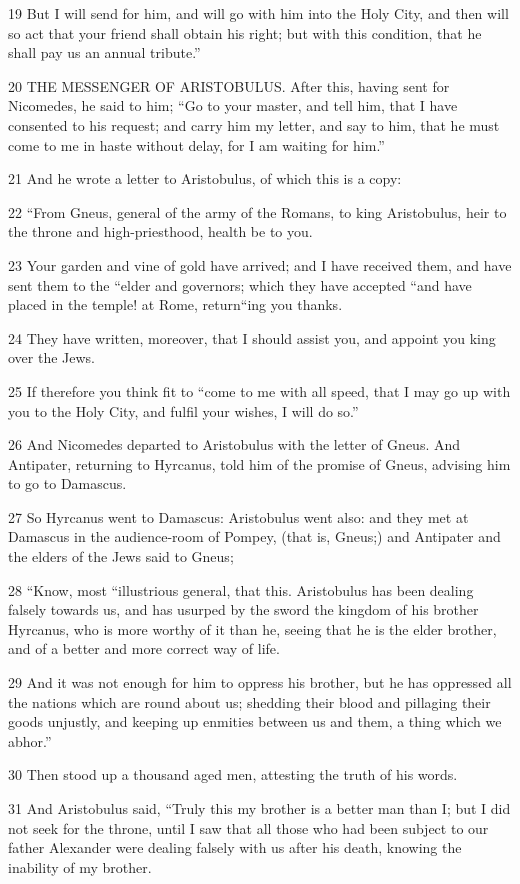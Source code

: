 19 But I will send for him, and will go with him into the Holy City, and then will so act that your friend shall obtain his right; but with this condition, that he shall pay us an annual tribute.” 

20 THE MESSENGER OF ARISTOBULUS. After this, having sent for Nicomedes, he said to him; “Go to your master, and tell him, that I have consented to his request; and carry him my letter, and say to him, that he must come to me in haste without delay, for I am waiting for him.” 

21 And he wrote a letter to Aristobulus, of which this is a copy: 

22 “From Gneus, general of the army of the Romans, to king Aristobulus, heir to the throne and high-priesthood, health be to you. 

23 Your garden and vine of gold have arrived; and I have received them, and have sent them to the “elder and governors; which they have accepted “and have placed in the temple! at Rome, return“ing you thanks.

24 They have written, moreover, that I should assist you, and appoint you king over the Jews. 

25 If therefore you think fit to “come to me with all speed, that I may go up with you to the Holy City, and fulfil your wishes, I will do so.” 

26 And Nicomedes departed to Aristobulus with the letter of Gneus. And Antipater, returning to Hyrcanus, told him of the promise of Gneus, advising him to go to Damascus. 

27 So Hyrcanus went to Damascus: Aristobulus went also: and they met at Damascus in the audience-room of Pompey, (that is, Gneus;) and Antipater and the elders of the Jews said to Gneus; 

28 “Know, most “illustrious general, that this. Aristobulus has been dealing falsely towards us, and has usurped by the sword the kingdom of his brother Hyrcanus, who is more worthy of it than he, seeing that he is the elder brother, and of a better and more correct way of life. 

29 And it was not enough for him to oppress his brother, but he has oppressed all the nations which are round about us; shedding their blood and pillaging their goods unjustly, and keeping up enmities between us and them, a thing which we abhor.” 

30 Then stood up a thousand aged men, attesting the truth of his words. 

31 And Aristobulus said, “Truly this my brother is a better man than I; but I did not seek for the throne, until I saw that all those who had been subject to our father Alexander were dealing falsely with us after his death, knowing the inability of my brother. 

